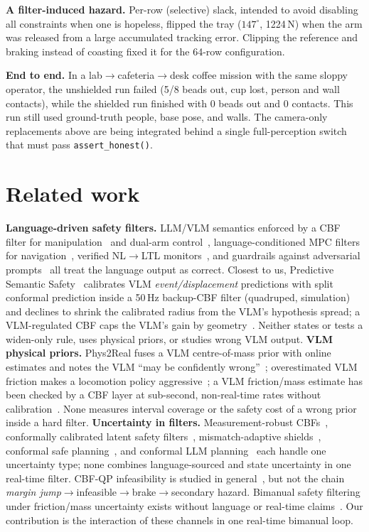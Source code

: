 \documentclass[10pt,twocolumn,letterpaper]{article}
\begin{document}
\textbf{A filter-induced hazard.} Per-row (selective) slack, intended to avoid disabling all constraints when one is hopeless, flipped the
tray ($147^\circ$, 1224\,N) when the arm was released from a large accumulated tracking error. Clipping the reference and braking instead of
coasting fixed it for the 64-row configuration.

\textbf{End to end.} In a lab$\to$cafeteria$\to$desk coffee mission with the same sloppy operator, the unshielded run failed (5/8 beads
out, cup lost, person and wall contacts), while the shielded run finished with 0 beads out and 0 contacts. This run still used ground-truth
people, base pose, and walls. The camera-only replacements above are being integrated behind a single full-perception switch that must pass
\texttt{assert\_honest()}.


\section{Related work}\label{sec:related}
\textbf{Language-driven safety filters.} LLM/VLM semantics enforced by a CBF filter for manipulation~\cite{brunke2025} and dual-arm
control~\cite{gfvla}, language-conditioned MPC filters for navigation~\cite{feng2025}, verified NL$\to$LTL monitors~\cite{safetychip}, and
guardrails against adversarial prompts~\cite{roboguard} all treat the language output as correct. Closest to us, Predictive Semantic
Safety~\cite{pss} calibrates VLM \emph{event/displacement} predictions with split conformal prediction inside a 50\,Hz backup-CBF filter
(quadruped, simulation) and declines to shrink the calibrated radius from the VLM's hypothesis spread; a VLM-regulated CBF caps the VLM's
gain by geometry~\cite{alphaadj}. Neither states or tests a widen-only rule, uses physical priors, or studies wrong VLM output.
\textbf{VLM physical priors.} Phys2Real fuses a VLM centre-of-mass prior with online estimates and notes the VLM ``may be confidently
wrong''~\cite{phys2real}; overestimated VLM friction makes a locomotion policy aggressive~\cite{peng2025}; a VLM friction/mass estimate has
been checked by a CBF layer at sub-second, non-real-time rates without calibration~\cite{physician}. None measures interval coverage or the
safety cost of a wrong prior inside a hard filter. \textbf{Uncertainty in filters.} Measurement-robust CBFs~\cite{dean2020},
conformally calibrated latent safety filters~\cite{seo2025}, mismatch-adaptive shields~\cite{lu2025}, conformal safe
planning~\cite{lindemann2023}, and conformal LLM planning~\cite{knowno} each handle one uncertainty type; none combines language-sourced and
state uncertainty in one real-time filter. CBF-QP infeasibility is studied in general~\cite{xiao2023,rousseas2025,hsu2024}, but not the
chain \emph{margin jump}$\to$infeasible$\to$brake$\to$secondary hazard. Bimanual safety filtering under friction/mass uncertainty exists
without language or real-time claims~\cite{johansson2025}. Our contribution is the interaction of these channels in one real-time
bimanual loop.
\end{document}
